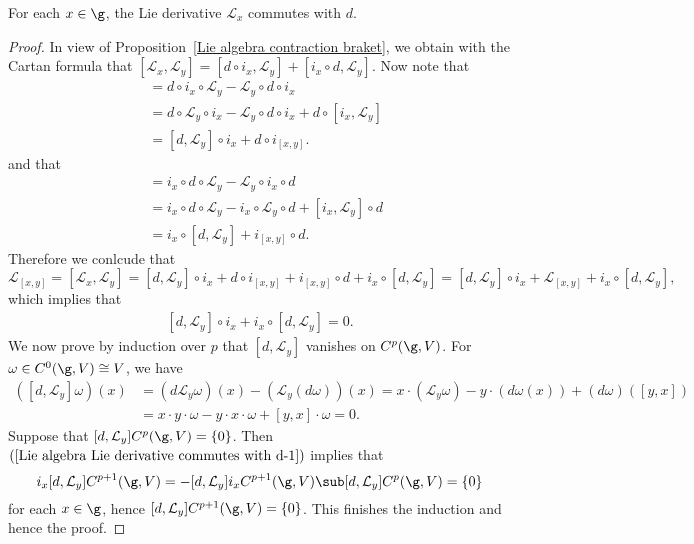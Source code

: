 \begin{corollary}\label{Lie algebra Lie derivative commutes with d}
For each $x\in\g$, the Lie derivative $\mathcal{L}_x$ commutes with $d$.
\end{corollary}
\begin{proof}
In view of Proposition~\ref{Lie algebra contraction braket}, we obtain with the Cartan formula that $[\mathcal{L}_x,\mathcal{L}_y]=[d\circ i_x,\mathcal{L}_y]+[i_x\circ d,\mathcal{L}_y]$. Now note that
\begin{align*}
[d\circ i_x,\mathcal{L}_y]&=d\circ i_x\circ\mathcal{L}_y-\mathcal{L}_y\circ d\circ i_x\\
&=d\circ\mathcal{L}_y\circ i_x-\mathcal{L}_y\circ d\circ i_x+d\circ[i_x,\mathcal{L}_y]\\
&=[d,\mathcal{L}_y]\circ i_x+d\circ i_{[x,y]}.
\end{align*}
and that
\begin{align*}
[i_x\circ d,\mathcal{L}_y]&=i_x\circ d\circ\mathcal{L}_y-\mathcal{L}_y\circ i_x\circ d\\
&=i_x\circ d\circ\mathcal{L}_y-i_x\circ\mathcal{L}_y\circ d+[i_x,\mathcal{L}_y]\circ d\\
&=i_x\circ[d,\mathcal{L}_y]+i_{[x,y]}\circ d.
\end{align*}
Therefore we conlcude that
\[\mathcal{L}_{[x,y]}=[\mathcal{L}_x,\mathcal{L}_y]=[d,\mathcal{L}_y]\circ i_x+d\circ i_{[x,y]}+i_{[x,y]}\circ d+i_x\circ[d,\mathcal{L}_y]=[d,\mathcal{L}_y]\circ i_x+\mathcal{L}_{[x,y]}+i_x\circ[d,\mathcal{L}_y],\]
which implies that
\begin{align}\label{Lie algebra Lie derivative commutes with d-1}
[d,\mathcal{L}_y]\circ i_x+i_x\circ[d,\mathcal{L}_y]=0.
\end{align}
We now prove by induction over $p$ that $[d,\mathcal{L}_y]$ vanishes on $C^p(\g,V)$. For $\omega\in C^0(\g,V)\cong V$, we have
\begin{align*}
([d,\mathcal{L}_y]\omega)(x)&=(d\mathcal{L}_y\omega)(x)-(\mathcal{L}_y(d\omega))(x)=x\cdot(\mathcal{L}_y\omega)-y\cdot(d\omega(x))+(d\omega)([y,x])\\
&=x\cdot y\cdot\omega-y\cdot x\cdot\omega+[y,x]\cdot\omega=0.
\end{align*}
Suppose that $[d,\mathcal{L}_y]C^p(\g,V)=\{0\}$. Then $(\ref{Lie algebra Lie derivative commutes with d-1})$ implies that
\[i_x[d,\mathcal{L}_y]C^{p+1}(\g,V)=-[d,\mathcal{L}_y]i_x C^{p+1}(\g,V)\sub[d,\mathcal{L}_y]C^p(\g,V)=\{0\}\]
for each $x\in\g$, hence $[d,\mathcal{L}_y]C^{p+1}(\g,V)=\{0\}$. This finishes the induction and hence the proof.
\end{proof}
